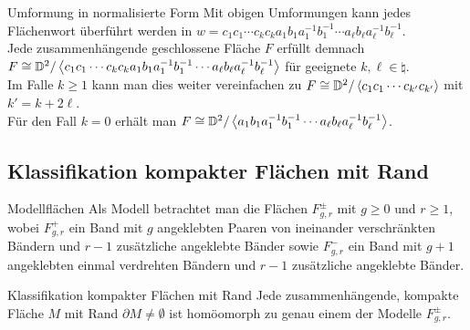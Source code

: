 \begin{Satz}{Umformung in normalisierte Form}
    Mit obigen Umformungen kann jedes Flächenwort überführt werden in
    $w = c_1 c_1 \dotsb c_k c_k a_1 b_1 a_1^{-1} b_1^{-1} \dotsb
    a_\ell b_\ell a_\ell^{-1} b_\ell^{-1}$. \\
    Jede zusammenhängende geschlossene Fläche $F$ erfüllt demnach \\
    $F \cong \mathbb{D}^2 /
    \left\langle{c_1 c_1 \dotsb c_k c_k a_1 b_1 a_1^{-1} b_1^{-1} \dotsb
    a_\ell b_\ell a_\ell^{-1} b_\ell^{-1}}\right\rangle$ für geeignete
    $k, \ell \in \natural$. \\
    Im Falle $k \ge 1$ kann man dies weiter vereinfachen zu
    $F \cong \mathbb{D}^2 / \left\langle{c_1 c_1 \dotsb c_{k'} c_{k'}}\right\rangle$
    mit $k' = k + 2\ell$. \\
    Für den Fall $k = 0$ erhält man
    $F \cong \mathbb{D}^2 / \left\langle{a_1 b_1 a_1^{-1} b_1^{-1} \dotsb
    a_\ell b_\ell a_\ell^{-1} b_\ell^{-1}}\right\rangle$.
\end{Satz}

\subsection{%
    Klassifikation kompakter Flächen mit Rand%
}

\begin{Def}{Modellflächen}
    Als Modell betrachtet man die Flächen $F_{g,r}^\pm$ mit $g \ge 0$ und
    $r \ge 1$, wobei
    $F_{g,r}^+$ ein Band mit $g$ angeklebten Paaren von ineinander
    verschränkten Bändern und $r - 1$ zusätzliche angeklebte Bänder sowie
    $F_{g,r}^-$ ein Band mit $g + 1$ angeklebten einmal verdrehten Bändern
    und $r - 1$ zusätzliche angeklebte Bänder.
\end{Def}

\begin{Satz}{Klassifikation kompakter Flächen mit Rand}
    Jede zusammenhängende, kompakte Fläche $M$ mit Rand
    $\partial M \not= \emptyset$ ist homöomorph zu genau einem der Modelle
    $F_{g,r}^\pm$.
\end{Satz}

\pagebreak
